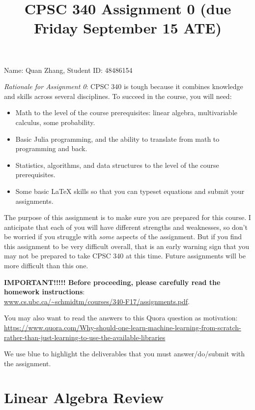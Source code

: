 \documentclass{article}
\def\blu#1{{\color{blu}#1}}
\begin{document}
\title{CPSC 340 Assignment 0 (due Friday September 15 ATE)}
\date{}
\maketitle
\vspace{-4em}

Name: Quan Zhang, Student ID: 48486154
\newline

\emph{Rationale for Assignment 0}: CPSC 340 is tough because it combines knowledge and skills across several disciplines. To succeed
in the course, you will need:

\begin{itemize}
\item Math to the level of the course prerequisites: linear algebra, multivariable calculus, some probability.
\item Basic Julia programming, and the ability to translate from math to programming and back.
\item Statistics, algorithms, and data structures to the level of the course prerequisites.
\item Some basic LaTeX skills so that you can typeset equations and submit your assignments.
\end{itemize}

The purpose of this assignment is to make sure you are prepared for this course. I anticipate that each
of you will have different strengths and weaknesses, so don't be worried if you struggle with \emph{some} aspects
of the assignment. But if you find this assignment
to be very difficult overall, that is an early warning sign that you may not be prepared to take CPSC 340
at this time. Future assignments will be more difficult than this one.

\textbf{IMPORTANT!!!!! Before proceeding, please carefully read the homework instructions}:\\ \url{www.cs.ubc.ca/~schmidtm/courses/340-F17/assignments.pdf}.

You may also want to read the answers to this Quora question as motivation:\\
{\scriptsize \url{https://www.quora.com/Why-should-one-learn-machine-learning-from-scratch-rather-than-just-learning-to-use-the-available-libraries}}

We use \blu{blue} to highlight the deliverables that you must answer/do/submit with the assignment.

\section{Linear Algebra Review}
\end{document}
